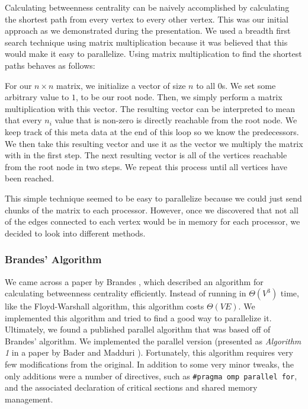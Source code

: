 \documentclass[11pt,a4paper,titlepage]{article}
\begin{document}
Calculating betweenness centrality can be naively accomplished by calculating
the shortest path from every vertex to every other vertex. This was our initial
approach as we demonstrated during the presentation. We used a breadth first
search technique using matrix multiplication because it was believed that this
would make it easy to parallelize. Using matrix multiplication to find the
shortest paths behaves as follows:

For our $n \times n$ matrix, we initialize a vector of size $n$ to all $0$s. We
set some arbitrary value to $1$, to be our root node. Then, we simply perform a
matrix multiplication with this vector. The resulting vector can be
interpreted to mean that every $n_i$ value that is non-zero is directly
reachable from the root node. We keep track of this meta data at the end of
this loop so we know the predecessors. We then take this resulting vector and
use it as the vector we multiply the matrix with in the first step. The next
resulting vector is all of the vertices reachable from the root node in two
steps. We repeat this process until all vertices have been reached.

This simple technique seemed to be easy to parallelize because we could just
send chunks of the matrix to each processor. However, once we discovered that
not all of the edges connected to each vertex would be in memory for each
processor, we decided to look into different methods.


\subsubsection{Brandes' Algorithm}

We came across a paper by Brandes \cite{brandes2001faster}, which described an
algorithm for calculating betweenness centrality efficiently. Instead of
running in $\Theta(V^3)$ time, like the Floyd-Warshall algorithm, this algorithm
costs $\Theta(VE)$. We implemented this algorithm and tried to find a good way to
parallelize it. Ultimately, we found a published parallel algorithm that was
based off of Brandes' algorithm. We implemented the parallel version (presented
as \textit{Algorithm 1} in a paper by Bader and Madduri
\cite{bader2006parallel}). Fortunately, this algorithm requires very few
modifications from the original. In addition to some very minor tweaks, the
only additions were a number of directives, such as \texttt{\#pragma omp
parallel for}, and the associated declaration of critical sections and shared
memory management.
\end{document}
